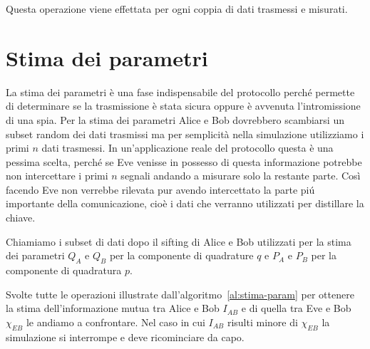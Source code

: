 Questa operazione viene effettata per ogni coppia di dati trasmessi e misurati.

\section{Stima dei parametri}
La stima dei parametri \`e una fase indispensabile del protocollo perch\'e permette di determinare se la trasmissione \`e stata sicura oppure \`e avvenuta l'intromissione di una spia. Per la stima dei parametri Alice e Bob dovrebbero scambiarsi un subset random dei dati trasmissi ma per semplicit\`a nella simulazione utilizziamo i primi $n$ dati trasmessi. In un'applicazione reale del protocollo questa \`e una pessima scelta, perch\'e se Eve venisse in possesso di questa informazione potrebbe non intercettare i primi $n$ segnali andando a misurare solo la restante parte. Cos\`i facendo Eve non verrebbe rilevata pur avendo intercettato la parte pi\'u importante della comunicazione, cio\`e i dati che verranno utilizzati per distillare la chiave.

Chiamiamo i subset di dati dopo il sifting di Alice e Bob utilizzati per la stima dei parametri $Q_A$ e $Q_B$ per la componente di quadrature $q$ e $P_A$ e $P_B$ per la componente di quadratura $p$.

Svolte tutte le operazioni illustrate dall'algoritmo~\ref{al:stima-param} per ottenere la stima dell'informazione mutua tra Alice e Bob $I_{AB}$ e di quella tra Eve e Bob $\chi_{EB}$ le andiamo a confrontare. Nel caso in cui $I_{AB}$ risulti minore di $\chi_{EB}$ la simulazione si interrompe e deve ricominciare da capo.

